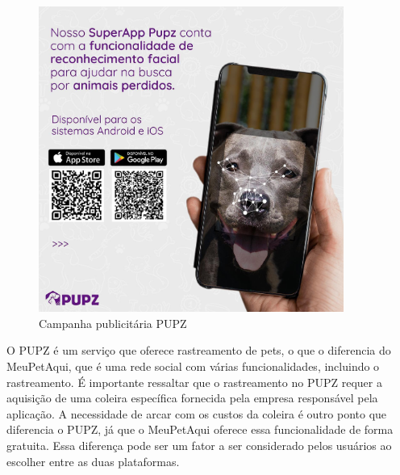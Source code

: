 \begin{figure}[htb]
     \centering
     \includegraphics[width=10cm]{arquivos/Figuras/image15.jpg}
     \caption{Campanha publicitária PUPZ}
     \label{fig:PUPZ}
\end{figure}

\newpage
O PUPZ é um serviço que oferece rastreamento de pets, o que o diferencia do MeuPetAqui, que é uma rede social com várias funcionalidades, incluindo o rastreamento. É importante ressaltar que o rastreamento no PUPZ requer a aquisição de uma coleira específica fornecida pela empresa responsável pela aplicação. A necessidade de arcar com os custos da coleira é outro ponto que diferencia o PUPZ, já que o MeuPetAqui oferece essa funcionalidade de forma gratuita. Essa diferença pode ser um fator a ser considerado pelos usuários ao escolher entre as duas plataformas.
